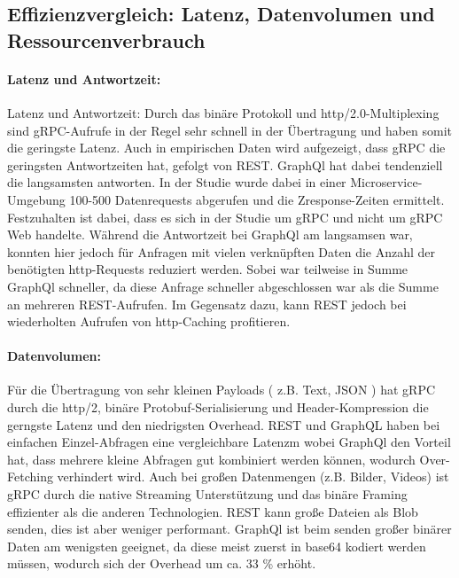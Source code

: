 \subsection{Effizienzvergleich: Latenz, Datenvolumen und Ressourcenverbrauch}

\paragraph{Latenz und Antwortzeit:}  
Latenz und Antwortzeit: Durch das binäre Protokoll und http/2.0-Multiplexing sind gRPC-Aufrufe in der Regel sehr schnell in der Übertragung und haben somit die geringste Latenz. Auch in empirischen Daten wird aufgezeigt, dass gRPC die geringsten Antwortzeiten hat, gefolgt von REST. GraphQl hat dabei tendenziell die langsamsten antworten. In der Studie wurde dabei in einer Microservice-Umgebung 100-500 Datenrequests abgerufen und die Zresponse-Zeiten ermittelt. Festzuhalten ist dabei, dass es sich in der Studie um gRPC und nicht um gRPC Web handelte. Während die Antwortzeit bei GraphQl am langsamsen war, konnten hier jedoch für Anfragen mit vielen verknüpften Daten die Anzahl der benötigten http-Requests reduziert werden. Sobei war teilweise in Summe GraphQl schneller, da diese Anfrage schneller abgeschlossen war als die Summe an mehreren REST-Aufrufen. Im Gegensatz dazu, kann REST jedoch bei wiederholten Aufrufen von http-Caching profitieren.

\paragraph{Datenvolumen:}  
Für die Übertragung von sehr kleinen Payloads ( z.B. Text, JSON ) hat gRPC durch die http/2, binäre Protobuf-Serialisierung und Header-Kompression die gerngste Latenz und den niedrigsten Overhead. REST und GraphQL haben bei einfachen Einzel-Abfragen eine vergleichbare Latenzm wobei GraphQl den Vorteil hat, dass mehrere kleine Abfragen gut kombiniert werden können, wodurch Over-Fetching verhindert wird.
Auch bei großen Datenmengen (z.B. Bilder, Videos) ist gRPC durch die native Streaming Unterstützung und das binäre Framing effizienter als die anderen Technologien. REST kann große Dateien als Blob senden, dies ist aber weniger performant. GraphQl ist beim senden großer binärer Daten am wenigsten geeignet, da diese meist zuerst in base64 kodiert werden müssen, wodurch sich der Overhead um ca. 33 \% erhöht. 


